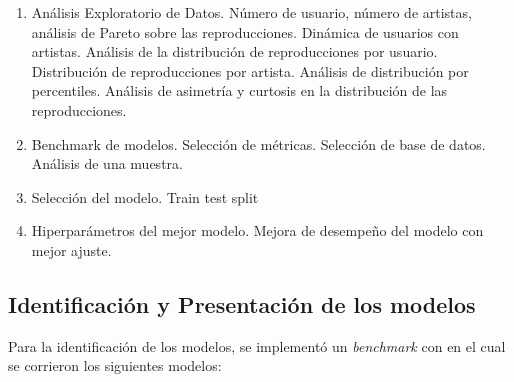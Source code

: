 \documentclass{article}
\begin{document}
\begin{enumerate}
    \item Análisis Exploratorio de Datos.
    \subitem Número de usuario, número de artistas, análisis de Pareto sobre las reproducciones.
    \subitem Dinámica de usuarios con artistas.
    \subitem Análisis de la distribución de reproducciones por usuario.
    \subitem Distribución de reproducciones por artista.
    \subitem Análisis de distribución por percentiles.
    \subitem Análisis de asimetría y curtosis en la distribución de las reproducciones.
    \item Benchmark de modelos.
    \subitem Selección de métricas.
    \subitem Selección de base de datos.
    \subitem Análisis de una muestra.
    \item Selección del modelo.
    \subitem Train test split
    \item Hiperparámetros del mejor modelo.
    \subitem Mejora de desempeño del modelo con mejor ajuste.
\end{enumerate}

\subsection{Identificación y Presentación de los modelos}

Para la identificación de los modelos, se implementó un \textit{benchmark} con en el cual se corrieron los siguientes modelos:
\end{document}
